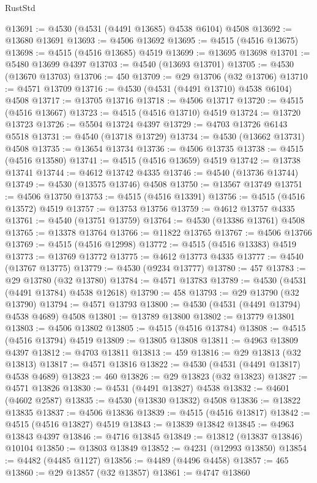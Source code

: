\begin{lexlean}{RustStd}
\begin{coremodule}
@13691 := @4530 (@4531 (@4491 @13685) @4538 @6104) @4508
@13692 := @13680 @13691
@13693 := @4506 @13692
@13695 := @4515 (@4516 @13675)
@13698 := @4515 (@4516 @13685) @4519
@13699 := @13695 @13698
@13701 := @5480 @13699 @4397
@13703 := @4540 (@13693 @13701)
@13705 := @4530 (@13670 @13703)
@13706 := 450
@13709 := @29 @13706 (@32 @13706)
@13710 := @4571 @13709
@13716 := @4530 (@4531 (@4491 @13710) @4538 @6104) @4508
@13717 := @13705 @13716
@13718 := @4506 @13717
@13720 := @4515 (@4516 @13667)
@13723 := @4515 (@4516 @13710) @4519
@13724 := @13720 @13723
@13726 := @5504 @13724 @4397
@13729 := @4703 @13726 @6143 @5518
@13731 := @4540 (@13718 @13729)
@13734 := @4530 (@13662 @13731) @4508
@13735 := @13654 @13734
@13736 := @4506 @13735
@13738 := @4515 (@4516 @13580)
@13741 := @4515 (@4516 @13659) @4519
@13742 := @13738 @13741
@13744 := @4612 @13742 @4335
@13746 := @4540 (@13736 @13744)
@13749 := @4530 (@13575 @13746) @4508
@13750 := @13567 @13749
@13751 := @4506 @13750
@13753 := @4515 (@4516 @13391)
@13756 := @4515 (@4516 @13572) @4519
@13757 := @13753 @13756
@13759 := @4612 @13757 @4335
@13761 := @4540 (@13751 @13759)
@13764 := @4530 (@13386 @13761) @4508
@13765 := @13378 @13764
@13766 := @11822 @13765
@13767 := @4506 @13766
@13769 := @4515 (@4516 @12998)
@13772 := @4515 (@4516 @13383) @4519
@13773 := @13769 @13772
@13775 := @4612 @13773 @4335
@13777 := @4540 (@13767 @13775)
@13779 := @4530 (@9234 @13777)
@13780 := 457
@13783 := @29 @13780 (@32 @13780)
@13784 := @4571 @13783
@13789 := @4530 (@4531 (@4491 @13784) @4538 @12618)
@13790 := 458
@13793 := @29 @13790 (@32 @13790)
@13794 := @4571 @13793
@13800 := @4530 (@4531 (@4491 @13794) @4538 @4689) @4508
@13801 := @13789 @13800
@13802 := @13779 @13801
@13803 := @4506 @13802
@13805 := @4515 (@4516 @13784)
@13808 := @4515 (@4516 @13794) @4519
@13809 := @13805 @13808
@13811 := @4963 @13809 @4397
@13812 := @4703 @13811
@13813 := 459
@13816 := @29 @13813 (@32 @13813)
@13817 := @4571 @13816
@13822 := @4530 (@4531 (@4491 @13817) @4538 @4689)
@13823 := 460
@13826 := @29 @13823 (@32 @13823)
@13827 := @4571 @13826
@13830 := @4531 (@4491 @13827) @4538
@13832 := @4601 (@4602 @2587)
@13835 := @4530 (@13830 @13832) @4508
@13836 := @13822 @13835
@13837 := @4506 @13836
@13839 := @4515 (@4516 @13817)
@13842 := @4515 (@4516 @13827) @4519
@13843 := @13839 @13842
@13845 := @4963 @13843 @4397
@13846 := @4716 @13845
@13849 := @13812 (@13837 @13846) @10104
@13850 := @13803 @13849
@13852 := @4231 (@12993 @13850)
@13854 := @4482 (@4485 @1127)
@13856 := @4489 (@4496 @4458)
@13857 := 465
@13860 := @29 @13857 (@32 @13857)
@13861 := @4747 @13860

\end{coremodule}
\end{lexlean}
